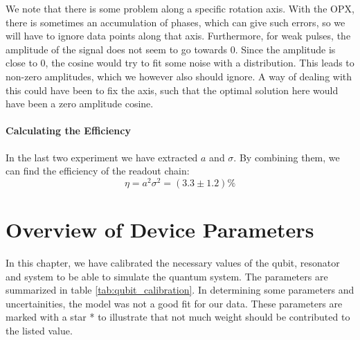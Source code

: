 We note that there is some problem along a specific rotation axis. With the OPX, there is sometimes an accumulation of phases, which can give such errors, so we will have to ignore data points along that axis. Furthermore, for weak pulses, the amplitude of the signal does not seem to go towards 0. Since the amplitude is close to 0, the cosine would try to fit some noise with a distribution. This leads to non-zero amplitudes, which we however also should ignore. A way of dealing with this could have been to fix the axis, such that the optimal solution here would have been a zero amplitude cosine. 


\paragraph{Calculating the Efficiency}
In the last two experiment we have extracted $a$ and $\sigma$. By combining them, we can find the efficiency of the readout chain:
\begin{equation}
    \eta = a^2\sigma^2 = (3.3 \pm 1.2) \% 
\end{equation}








\FloatBarrier
\section{Overview of Device Parameters}\label{sec:overview_section}
In this chapter, we have calibrated the necessary values of the qubit, resonator and system to be able to simulate the quantum system. The parameters are summarized in table \ref{tab:qubit_calibration}. In determining some parameters and uncertainities, the model was not a good fit for our data. These parameters are marked with a star * to illustrate that not much weight should be contributed to the listed value.


